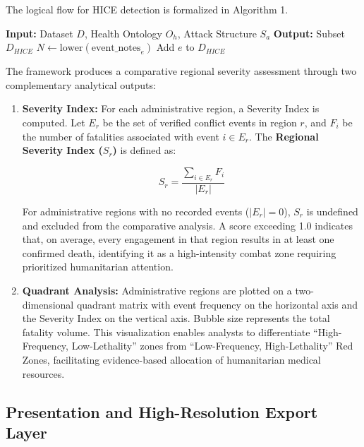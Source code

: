 \documentclass[conference]{IEEEtran}
\begin{document}
The logical flow for HICE detection is formalized in Algorithm 1.

\begin{algorithm}
\caption{HICE Detection Logic}
\begin{algorithmic}
\STATE \textbf{Input:} Dataset $D$, Health Ontology $O_h$, Attack Structure $S_a$
\STATE \textbf{Output:} Subset $D_{HICE}$
        \STATE $N \gets \text{lower}(\text{event\_notes}_e)$
            \STATE Add $e$ to $D_{HICE}$
        \ENDIF
    \ENDIF
\ENDFOR
\end{algorithmic}
\end{algorithm}

The framework produces a comparative regional severity assessment through two complementary analytical outputs:

\begin{enumerate}
    \item \textbf{Severity Index:} For each administrative region, a Severity Index is computed. Let $E_r$ be the set of verified conflict events in region $r$, and $F_i$ be the number of fatalities associated with event $i \in E_r$. The \textbf{Regional Severity Index ($S_r$)} is defined as:
    
    \[
        S_r = \frac{\sum_{i \in E_r} F_i}{|E_r|}
    \]

    For administrative regions with no recorded events ($|E_r| = 0$), $S_r$ is undefined and excluded from the comparative analysis. A score exceeding 1.0 indicates that, on average, every engagement in that region results in at least one confirmed death, identifying it as a high-intensity combat zone requiring prioritized humanitarian attention.

    \item \textbf{Quadrant Analysis:} Administrative regions are plotted on a two-dimensional quadrant matrix with event frequency on the horizontal axis and the Severity Index on the vertical axis. Bubble size represents the total fatality volume. This visualization enables analysts to differentiate ``High-Frequency, Low-Lethality'' zones from ``Low-Frequency, High-Lethality'' Red Zones, facilitating evidence-based allocation of humanitarian medical resources.
\end{enumerate}

\subsection{Presentation and High-Resolution Export Layer}
\end{document}
